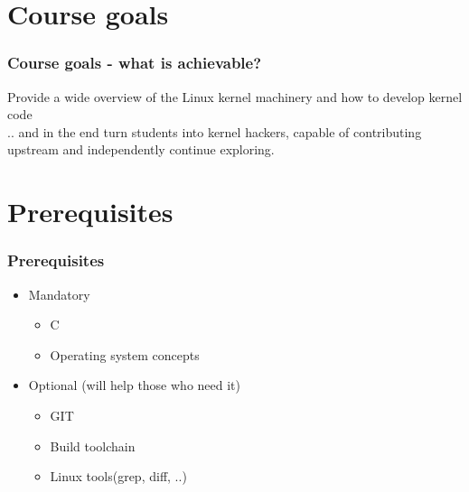\documentclass{beamer}
\begin{document}
\section{Course goals} 
\begin{frame}
\frametitle{Course goals - what is achievable?}
Provide a wide overview of the Linux kernel machinery and how to develop kernel code \\
.. and in the end turn students into kernel hackers, capable of contributing upstream and independently continue exploring.
\end{frame}

\section{Prerequisites}

\begin{frame}
\frametitle{Prerequisites}
\begin{itemize}
	\item Mandatory
	\begin{itemize}
		\item C
		\item Operating system concepts
	\end{itemize}

	\item Optional (will help those who need it)
	\begin{itemize}
		\item GIT
		\item Build toolchain
		\item Linux tools(grep, diff, ..)
	\end{itemize}
\end{itemize}
\end{frame}

\end{document}
